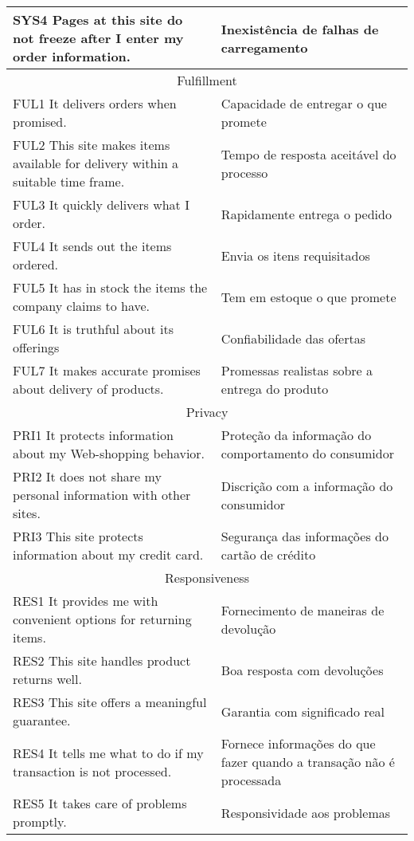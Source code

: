 \begin{apendicesenv}
\begin{table}[]
{\begin{tabular}{|l|l|}
SYS4 Pages at this site do not freeze after I enter my order information. & Inexistência de falhas de carregamento \\ \hline
\multicolumn{2}{|c|}{\cellcolor[HTML]{C0C0C0}Fulfillment} \\ \hline
FUL1 It delivers orders when promised. & Capacidade de entregar o que promete \\ \hline
FUL2 This site makes items available for delivery within a suitable time frame. & Tempo de resposta aceitável do processo \\ \hline
FUL3 It quickly delivers what I order. & Rapidamente entrega o pedido \\ \hline
FUL4 It sends out the items ordered. & Envia os itens requisitados \\ \hline
FUL5 It has in stock the items the company claims to have. & Tem em estoque o que promete \\ \hline
FUL6 It is truthful about its offerings & Confiabilidade das ofertas \\ \hline
FUL7 It makes accurate promises about delivery of products. & Promessas realistas sobre a entrega do produto \\ \hline
\multicolumn{2}{|c|}{\cellcolor[HTML]{C0C0C0}Privacy} \\ \hline
PRI1 It protects information about my Web-shopping behavior. & Proteção da informação do comportamento do consumidor \\ \hline
PRI2 It does not share my personal information with other sites. & Discrição com a informação do consumidor \\ \hline
PRI3 This site protects information about my credit card. & Segurança das informações do cartão de crédito \\ \hline
\multicolumn{2}{|c|}{\cellcolor[HTML]{C0C0C0}Responsiveness} \\ \hline
RES1 It provides me with convenient options for returning items. & Fornecimento de maneiras de devolução \\ \hline
RES2 This site handles product returns well. & Boa resposta com devoluções \\ \hline
RES3 This site offers a meaningful guarantee. & Garantia com significado real \\ \hline
RES4 It tells me what to do if my transaction is not processed. & Fornece informações do que fazer quando a transação não é processada \\ \hline
RES5 It takes care of problems promptly. & Responsividade aos problemas \\ \hline

\end{tabular}}
\end{table}
\end{apendicesenv}
